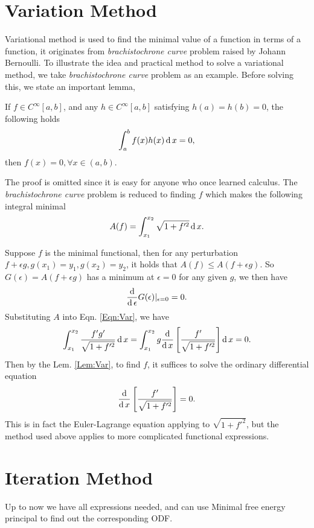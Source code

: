 \section{Variation Method}
Variational method is used to find the minimal value of a function in terms of a function, it originates from \textit{brachistochrone curve} problem raised by Johann Bernoulli. To illustrate the idea and practical method to solve a variational method, we take \textit{brachistochrone curve} problem as an example. Before solving this, we state an important lemma,
\begin{lemma}
	If $f\in C^{\infty}[a,b]$, and any $h\in C^{\infty}[a,b]$ satisfying $h(a)=h(b)=0$, the following holds
	$$
	\int_a^bf(x)h(x)\operatorname{d} x=0,
	$$
	then $f(x)=0, \forall x\in (a,b)$.
\end{lemma}\label{Lem:Var}
The proof is omitted since it is easy for anyone who once learned calculus. The \textit{brachistochrone curve} problem is reduced to finding $f$ which makes the following integral minimal
\begin{equation}
	A(f)=\int_{x_{1}}^{x_{2}} \sqrt{1+f'^2} \operatorname{d}x.
\end{equation}

Suppose $f$ is the minimal functional, then for any perturbation $f+\epsilon g, g(x_1)=y_1, g(x_2)=y_2$, it holds that $A(f)\leq A(f+\epsilon g)$. So $G(\epsilon) = A(f+\epsilon g)$ has a minimum at $\epsilon = 0$ for any given $g$, we then have
\begin{equation}\label{Eqn:Var}
	\frac{\operatorname{d}}{\operatorname{d}\epsilon}G(\epsilon)|_{\epsilon=0}=0.
\end{equation}
Substituting $A$ into Eqn. \ref{Eqn:Var}, we have
\begin{equation}
	\int_{x_{1}}^{x_{2}} \frac{f'g'}{\sqrt{1+f'^2}} \operatorname{d} x = \int_{x_{1}}^{x_{2}} g \frac{\operatorname{d}}{\operatorname{d}x}\left[\frac{f'}{\sqrt{1+f'^2}}\right]\operatorname{d}x=0.
\end{equation}
Then by the Lem. \ref{Lem:Var}, to find $f$, it suffices to solve the ordinary differential equation
\begin{equation}
	\frac{\operatorname{d}}{\operatorname{d}x}\left[\frac{f'}{\sqrt{1+f'^2}}\right]=0.
\end{equation}
This is in fact the Euler-Lagrange equation applying to $\sqrt{1+f'^2}$, but the method used above applies to more complicated functional expressions.


\section{Iteration Method}\label{Sec:Iter}
Up to now we have all expressions needed, and can use Minimal free energy principal to find out the corresponding ODF.

